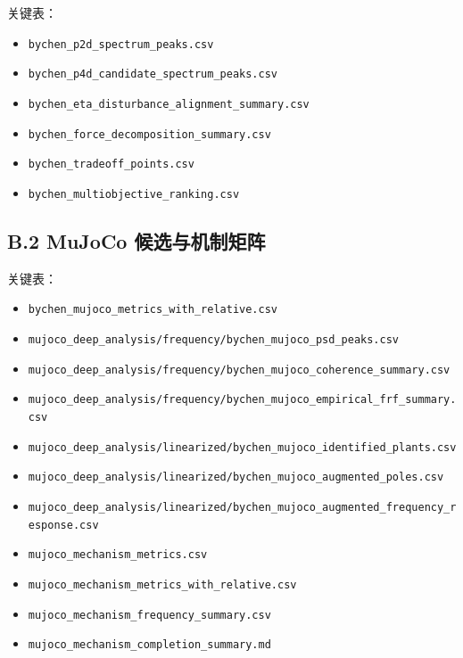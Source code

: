 \begin{Shaded}
\begin{Highlighting}[]
\end{Highlighting}
\end{Shaded}

关键表：

\begin{itemize}
\tightlist
\item
  \texttt{bychen\_p2d\_spectrum\_peaks.csv}
\item
  \texttt{bychen\_p4d\_candidate\_spectrum\_peaks.csv}
\item
  \texttt{bychen\_eta\_disturbance\_alignment\_summary.csv}
\item
  \texttt{bychen\_force\_decomposition\_summary.csv}
\item
  \texttt{bychen\_tradeoff\_points.csv}
\item
  \texttt{bychen\_multiobjective\_ranking.csv}
\end{itemize}

\subsection{B.2 MuJoCo 候选与机制矩阵}\label{b.2-mujoco-ux5019ux9009ux4e0eux673aux5236ux77e9ux9635}

\begin{Shaded}
\begin{Highlighting}[]
\end{Highlighting}
\end{Shaded}

关键表：

\begin{itemize}
\tightlist
\item
  \texttt{bychen\_mujoco\_metrics\_with\_relative.csv}
\item
  \texttt{mujoco\_deep\_analysis/frequency/bychen\_mujoco\_psd\_peaks.csv}
\item
  \texttt{mujoco\_deep\_analysis/frequency/bychen\_mujoco\_coherence\_summary.csv}
\item
  \texttt{mujoco\_deep\_analysis/frequency/bychen\_mujoco\_empirical\_frf\_summary.csv}
\item
  \texttt{mujoco\_deep\_analysis/linearized/bychen\_mujoco\_identified\_plants.csv}
\item
  \texttt{mujoco\_deep\_analysis/linearized/bychen\_mujoco\_augmented\_poles.csv}
\item
  \texttt{mujoco\_deep\_analysis/linearized/bychen\_mujoco\_augmented\_frequency\_response.csv}
\item
  \texttt{mujoco\_mechanism\_metrics.csv}
\item
  \texttt{mujoco\_mechanism\_metrics\_with\_relative.csv}
\item
  \texttt{mujoco\_mechanism\_frequency\_summary.csv}
\item
  \texttt{mujoco\_mechanism\_completion\_summary.md}
\end{itemize}


